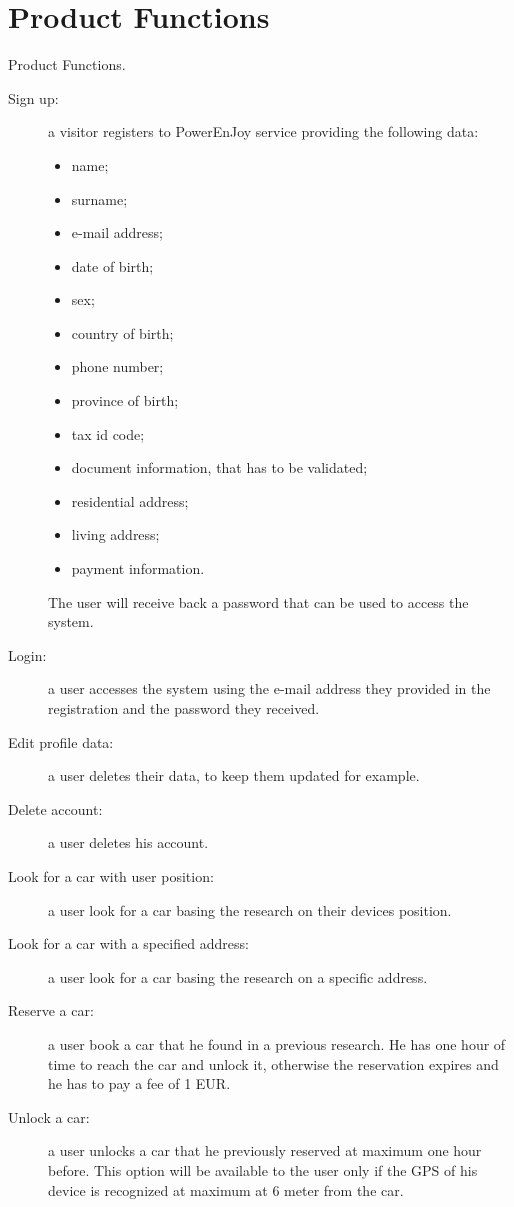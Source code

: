 \section{Product Functions}
Product Functions.
\begin{description}
\item[Sign up:] a visitor registers to PowerEnJoy service providing the following data:
	\begin{itemize}
	\item name;
	\item surname;
	\item e-mail address;
	\item date of birth;
	\item sex;
	\item country of birth;
	\item phone number;
	\item province of birth;
	\item tax id code; %
	\item document information, that has to be validated;
	\item residential address;
	\item living address;
	\item payment information.
	\end{itemize}
	The user will receive back a password that can be used to access the system.
\item[Login:] a user accesses the system using the e-mail address they provided in the registration and the password they received.
\item[Edit profile data:] a user deletes their data, to keep them updated for example.
\item[Delete account:] a user deletes his account.
\item[Look for a car with user position:] a user look for a car basing the research on their devices position.
\item[Look for a car with a specified address:] a user look for a car basing the research on a specific address.
\item[Reserve a car:] a user book a car that he found in a previous research. He has one hour of time to reach the car and unlock it, otherwise the reservation expires and he has to pay a fee of 1 EUR.
\item[Unlock a car:] a user unlocks a car that he previously reserved at maximum one hour before. This option will be available to the user only if the GPS of his device is recognized at maximum at 6 meter from the car.

\end{description}
